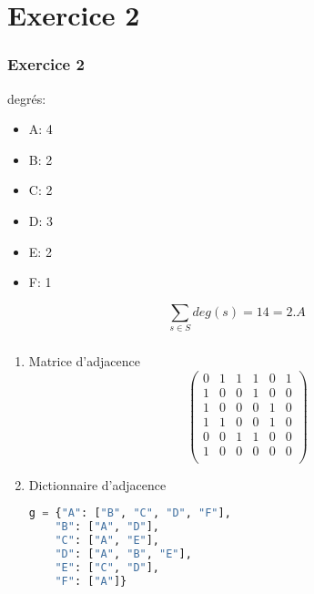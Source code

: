 \documentclass[svgnames,11pt]{beamer}
\begin{document}
\section{Exercice 2}
\begin{frame}
    \frametitle{Exercice 2}

    degrés:
    \begin{itemize}
        \item A: 4
        \item B: 2
        \item C: 2
        \item D: 3
        \item E: 2
        \item F: 1
    \end{itemize}
    $$\sum_{s\in S}{deg(s)}=14=2.A$$
\end{frame}
\begin{frame}[fragile]
    \frametitle{}

    \begin{enumerate}
        \item Matrice d'adjacence
              $$\begin{pmatrix}
                      0 & 1 & 1 & 1 & 0 & 1 \\
                      1 & 0 & 0 & 1 & 0 & 0 \\
                      1 & 0 & 0 & 0 & 1 & 0 \\
                      1 & 1 & 0 & 0 & 1 & 0 \\
                      0 & 0 & 1 & 1 & 0 & 0 \\
                      1 & 0 & 0 & 0 & 0 & 0 \\
                  \end{pmatrix}$$
        \item Dictionnaire d'adjacence
              \begin{lstlisting}[language=Python , basicstyle=\ttfamily\small, xleftmargin=2em, xrightmargin=2em]
g = {"A": ["B", "C", "D", "F"],
    "B": ["A", "D"],
    "C": ["A", "E"],
    "D": ["A", "B", "E"],
    "E": ["C", "D"],
    "F": ["A"]} 
\end{lstlisting}
    \end{enumerate}
\end{frame}
\end{document}
